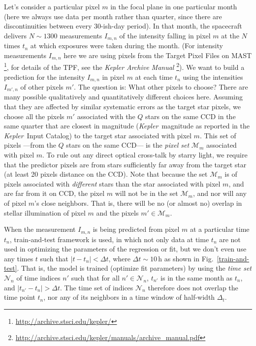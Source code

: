 \documentclass[12pt, preprint]{aastex}
\newcommand{\project}[1]{\textsl{#1}}
\newcommand{\Kepler}{\project{Kepler}}
\newcommand{\set}[1]{\mathcal{#1}}
\begin{document}
Let's consider a particular pixel $m$ in the focal plane in one particular month
  (here we always use data per month rather than quarter,  since there are discontinuities between every 30-ish-day period).
In that month, the spacecraft delivers $N\sim 1300$ measurements $I_{m,n}$
  of the intensity falling in pixel $m$ at the $N$ times $t_n$ at which exposures were taken during the month.
(For intensity measurements $I_{m,n}$ here we are using pixels from the Target Pixel Files on MAST
  \footnote{\url{http://archive.stsci.edu/kepler/}}, for details of the TPF, 
  see the \project{Kepler Archive Manual} 
  \footnote{\url{http://archive.stsci.edu/kepler/manuals/archive_manual.pdf}}).
We want to build a prediction for the intensity $I_{m,n}$ in pixel $m$ at each time $t_n$
  using the intensities $I_{m',n}$ of other pixels $m'$.
The question is:  What other pixels to choose?
There are many possible qualitatively and quantitatively different choices here.
Assuming that they are affected by similar systematic errors as the target star pixels, 
  we choose all the pixels $m'$ associated with the $Q$ stars on the same CCD in the same quarter that are closest in magnitude
  (\Kepler\ magnitude as reported in the \Kepler\ Input Catalog)
  to the target star associated with pixel $m$.
This set of pixels%
  ---from the $Q$ stars on the same CCD---%
  is the \emph{pixel set} $\set{M}_m$ associated with pixel $m$.
   To rule out any direct optical cross-talk by starry 
light, we require that the predictor pixels are from stars
sufficiently far away from the target star (at least 20 pixels distance on the CCD).
Note that because the set $\set{M}_m$ is of pixels associated with \emph{different} stars
  than the star associated with pixel $m$, and are far from it on CCD, 
  the pixel $m$ will not be in the set $\set{M}_m$,
  and nor will any of pixel $m$'s close neighbors.
That is, there will be no (or almost no) overlap in stellar illumination of pixel $m$
  and the pixels $m'\in\set{M}_m$.

When the measurement $I_{m,n}$ is being predicted from pixel $m$ at a particular time $t_n$,
  train-and-test framework is used, in which not only
  data at time $t_n$ are not used in optimizing the parameters of the regression or fit,
  but we don't even use any times $t$ such that $|t-t_n| < \Delta t$,
  where $\Delta t\sim 10$\,h as shown in Fig.~\ref{train-and-test}.
That is, the model is trained (optimize fit parameters) by using the \emph{time set} $\set{N}_n$ of time
  indices $n'$ such that for all $n'\in\set{N}_n$,
  $t_{n'}$ is in the same month as $t_n$,
  and $|t_{n'} - t_n|>\Delta t$.
The time set of indices $\set{N}_n$ therefore does not overlap the time point $t_n$,
  nor any of its neighbors in a time window of half-width $\Delta_t$. 
  
\end{document}
